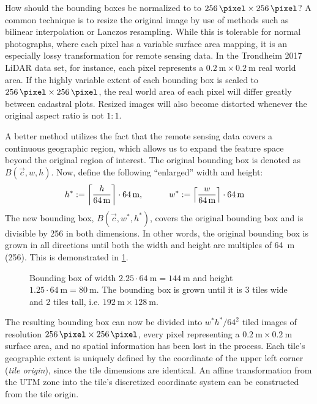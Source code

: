 How should the bounding boxes be normalized to to $\SI{256}{\pixel} \times \SI{256}{\pixel}$?
A common technique is to resize the original image by use of methods such as bilinear interpolation or Lanczos resampling.
While this is tolerable for normal photographs, where each pixel has a variable surface area mapping, it is an especially lossy transformation for remote sensing data.
In the Trondheim 2017 LiDAR data set, for instance, each pixel represents a $\SI{0.2}{\meter} \times \SI{0.2}{\meter}$ real world area.
If the highly variable extent of each bounding box is scaled to $\SI{256}{\pixel} \times \SI{256}{\pixel}$, the real world area of each pixel will differ greatly between cadastral plots.
Resized images will also become distorted whenever the original aspect ratio is not $1:1$.

A better method utilizes the fact that the remote sensing data covers a continuous geographic region, which allows us to expand the feature space beyond the original region of interest.
The original bounding box is denoted as $B(\vec{c}, w, h)$.
Now, define the following \enquote{enlarged} width and height:
%
\begin{align*}
  h^* &:= \left\lceil \frac{h}{\SI{64}{\meter}} \right\rceil \cdot \SI{64}{\meter},
  \hspace{3em}
  w^* := \left\lceil \frac{w}{\SI{64}{\meter}} \right\rceil \cdot \SI{64}{\meter}
\end{align*}
%
The new bounding box, $B(\vec{c}, w^*, h^*)$, covers the original bounding box and is divisible by \SI{256}{\pixel} in both dimensions.
In other words, the original bounding box is grown in all directions until both the width and height are multiples of \SI{64}{\meter} (\SI{256}{\pixel}).
This is demonstrated in \cref{fig:bbox-growing}.

\begin{figure}[H]
  \centering
  
  \caption[Illustration of bounding box growing.]{%
    Bounding box of width $2.25 \cdot \SI{64}{\meter} = \SI{144}{\meter}$ and height $1.25 \cdot \SI{64}{\meter} = \SI{80}{\meter}$.
    The bounding box is grown until it is 3 tiles wide and 2 tiles tall, i.e. $\SI{192}{\meter} \times \SI{128}{\meter}$.
  }%
  \label{fig:bbox-growing}
\end{figure}

The resulting bounding box can now be divided into $w^*h^* / 64^2$ tiled images of resolution $\SI{256}{\pixel} \times \SI{256}{\pixel}$, every pixel representing a $\SI{0.2}{\meter} \times \SI{0.2}{\meter}$ surface area, and no spatial information has been lost in the process.
Each tile's geographic extent is uniquely defined by the coordinate of the upper left corner (\textit{tile origin}), since the tile dimensions are identical.
An affine transformation from the UTM zone into the tile's discretized coordinate system can be constructed from the tile origin.

